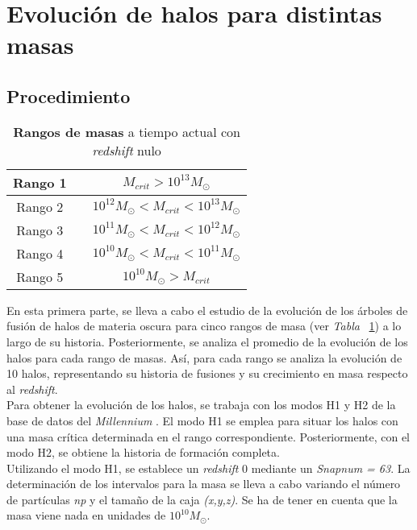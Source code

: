 \section{Evolución de halos para distintas masas} 
\label{sec:2} %

\subsection{Procedimiento}
\label{subsec:2_A}

\begin{table}[H]
\begin{center}
\begin{tabular}{ccc}
\toprule
\cellcolor[gray]{0.9}Rango 1 & & $M_{crit}>10^{13}M_\odot$ \\
\midrule
\cellcolor[gray]{0.9}Rango 2 & & $10^{12}M_\odot<M_{crit}<10^{13}M_\odot$ \\
\midrule
\cellcolor[gray]{0.9}Rango 3 & & $10^{11}M_\odot<M_{crit}<10^{12}M_\odot$ \\
\midrule
\cellcolor[gray]{0.9}Rango 4 & & $10^{10}M_\odot<M_{crit}<10^{11}M_\odot$ \\
\midrule
\cellcolor[gray]{0.9}Rango 5 & & $10^{10}M_\odot>M_{crit}$ \\
\bottomrule
\end{tabular}
\end{center}
\caption{\textbf{Rangos de masas} a tiempo actual con \textit{redshift} nulo}
\label{tab:tabla2}
\end{table}

En esta primera parte, se lleva a cabo el estudio de la evolución de los árboles de fusión de halos de materia oscura para cinco rangos de masa (ver \textit{Tabla} ~\ref{tab:tabla2}) a lo largo de su historia. Posteriormente, se analiza el promedio de la evolución de los halos para cada rango de masas. Así, para cada rango se analiza la evolución de 10 halos, representando su historia de fusiones y su crecimiento en masa respecto al \textit{redshift}.   \\

Para obtener la evolución de los halos, se trabaja con los modos H1 y H2 de la base de datos del \textit{Millennium} \cite{6}. El modo H1 se emplea para situar los halos con una masa crítica determinada en el rango correspondiente. Posteriormente, con el modo H2, se obtiene la historia de formación completa. \\

Utilizando el modo H1, se establece un \textit{redshift} 0 mediante un \textit{Snapnum = 63}. La determinación de los intervalos para la masa se lleva a cabo variando el número de partículas \textit{np} y el tamaño de la caja \textit{(x,y,z)}. Se ha de tener en cuenta que la masa viene nada en unidades de $10^{10}M_\odot$. \\

